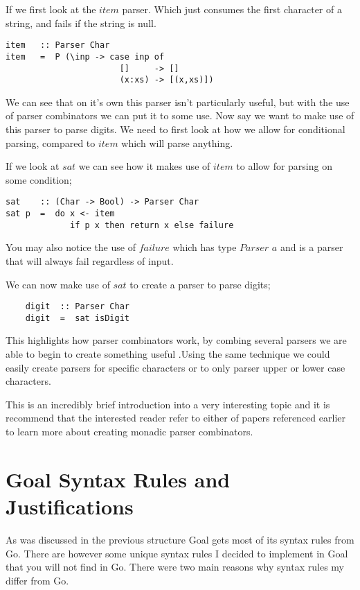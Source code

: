 If we first look at the $item$ parser. Which just consumes the first character of a string, and fails if the string is null. 

\newpage

\begin{lstlisting}
item   :: Parser Char
item   =  P (\inp -> case inp of
                       []     -> []
                       (x:xs) -> [(x,xs)])
\end{lstlisting}

We can see that on it's own this parser isn't particularly useful, but with the use of parser combinators we can put it to some use. Now say we want to make use of this parser to parse digits. We need to first look at how we allow for conditional parsing, compared to $item$ which will parse anything. 

If we look at $sat$ we can see how it makes use of $item$ to allow for parsing on some condition;

\begin{lstlisting}
sat    :: (Char -> Bool) -> Parser Char
sat p  =  do x <- item
             if p x then return x else failure
\end{lstlisting}

You may also notice the use of $failure$ which has type  $Parser$ $a$ and is a parser that will always fail regardless of input. 

We can now make use of $sat$ to create a parser to parse digits;

\begin{lstlisting}
	digit  :: Parser Char
	digit  =  sat isDigit
\end{lstlisting}

This highlights how parser combinators work, by combing several parsers we are able to begin to create something useful .Using the same technique we could easily create parsers for specific characters or to only parser upper or lower case characters.

This is an incredibly brief introduction into a very interesting topic and it is recommend that the interested reader refer to either of papers referenced earlier to learn more about creating monadic parser combinators.

\section{Goal Syntax Rules and Justifications}

As was discussed in the previous structure Goal gets most of its syntax rules from Go. There are however some unique syntax rules I decided to implement in Goal that you will not find in Go. There were two main reasons why syntax rules my differ from Go. 

